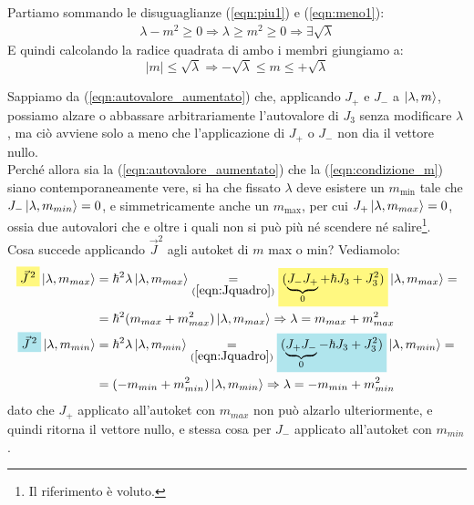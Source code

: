\documentclass[../../FisicaTeorica.tex]{subfiles}
\begin{document}
Partiamo sommando le disuguaglianze (\ref{eqn:piu1}) e (\ref{eqn:meno1}): 
\begin{align*}
\lambda - m^2 \geq 0 \Rightarrow \lambda \geq m^2 \geq 0 \Rightarrow  \exists \sqrt{\lambda}
\end{align*}
E quindi calcolando la radice quadrata di ambo i membri giungiamo a:
\begin{equation}
|m| \leq \sqrt{\lambda} \Rightarrow -\sqrt{\lambda} \leq m \leq + \sqrt{\lambda}
\label{eqn:condizione_m}
\end{equation}

Sappiamo da (\ref{eqn:autovalore_aumentato}) che, applicando $J_+$ e $J_-$ a $\Ket{\lambda,m}$, possiamo alzare o abbassare arbitrariamente l'autovalore di $J_3$ senza modificare $\lambda$, ma ciò avviene solo a meno che l'applicazione di $J_+$ o $J_-$ non dia il vettore nullo.\\

Perché allora sia la (\ref{eqn:autovalore_aumentato}) che la (\ref{eqn:condizione_m}) siano contemporaneamente vere, si ha che fissato $\lambda$ deve esistere un $m_{\min}$ tale che $J_- \Ket{\lambda, m_{min}}=0$, e simmetricamente anche un $m_{\max}$, per cui $J_{+}\Ket{\lambda, m_{max}} = 0$, ossia due autovalori che  e oltre i quali non si può più né scendere né salire\footnote{Il riferimento è voluto.}.\\

Cosa succede applicando $\vec{J}^2$ agli autoket di $m$ max o min? Vediamolo:\begin{align*}
\hlc{Yellow}{\vec{J}^{\,2}} \ket{\lambda, m_{max}} &= \hbar^2 \lambda \ket{\lambda, m_{max}} \underset{(\ref{eqn:Jquadro})}{=} \hlc{Yellow}{(\underbrace{J_- J_+}_{0} + \hbar J_3 + J_3^2)} \ket{\lambda, m_{max}} =
\\&= \hbar^2(m_{max}+m_{max}^2)\ket{\lambda, m_{max}} \Rightarrow \lambda = m_{max} + m^2_{max}\\
\hlc{SkyBlue}{\vec{J}^{\,2}}\ket{\lambda, m_{min}} &= \hbar^2 \lambda \ket{\lambda, m_{min}} \underset{(\ref{eqn:Jquadro})}{=
}\hlc{SkyBlue}{(\underbrace{J_+ J_-}_{0} - \hbar J_3 + J_3^2)} \ket{\lambda, m_{min}} =\\&= (-m_{min}+m_{min}^2) \ket{\lambda, m_{min}} \Rightarrow \lambda = -m_{min} + m_{min}^2
\end{align*}
dato che $J_+$ applicato all'autoket con $m_{max}$ non può alzarlo ulteriormente, e quindi ritorna il vettore nullo, e stessa cosa per $J_-$ applicato all'autoket con $m_{min}$.
\end{document}
